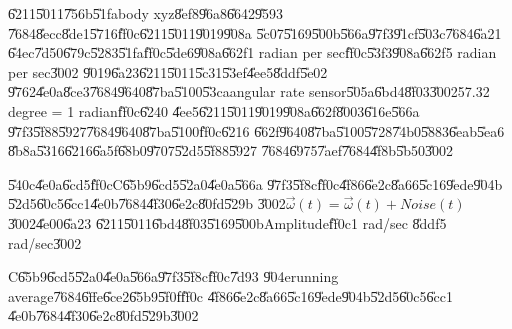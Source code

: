 \U{6211}\U{5011}\U{756b}\U{51fa}body xyz\U{8ef8}\U{96a8}\U{6642}\U{9593}%
\U{7684}\U{8ecc}\U{8de1}\U{5716}\U{ff0c}\U{6211}\U{5011}\U{9019}\U{908a}%
\U{5c07}\U{5169}\U{500b}\U{566a}\U{97f3}\U{91cf}\U{503c}\U{7684}\U{6a21}%
\U{64ec}\U{7d50}\U{679c}\U{5283}\U{51fa}\U{ff0c}\U{5de6}\U{908a}\U{662f}1
radian per sec\U{ff0c}\U{53f3}\U{908a}\U{662f}5 radian per sec\U{3002}%
\U{9019}\U{6a23}\U{6211}\U{5011}\U{5c31}\U{53ef}\U{4ee5}\U{8ddf}\U{5e02}%
\U{9762}\U{4e0a}\U{8ce3}\U{7684}\U{9640}\U{87ba}\U{5100}\U{53ca}angular rate
sensor\U{505a}\U{6bd4}\U{8f03}\U{3002}57.32 degree = 1 radian\U{ff0c}\U{6240}%
\U{4ee5}\U{6211}\U{5011}\U{9019}\U{908a}\U{662f}\U{8003}\U{616e}\U{566a}%
\U{97f3}\U{5f88}\U{5927}\U{7684}\U{9640}\U{87ba}\U{5100}\U{ff0c}\U{6216}%
\U{662f}\U{9640}\U{87ba}\U{5100}\U{5728}\U{74b0}\U{5883}\U{6eab}\U{5ea6}%
\U{8b8a}\U{5316}\U{6216}\U{6a5f}\U{68b0}\U{9707}\U{52d5}\U{5f88}\U{5927}%
\U{7684}\U{6975}\U{7aef}\U{7684}\U{4f8b}\U{5b50}\U{3002}

%
\begin{center}

\end{center}%

\bigskip

\begin{case}
\U{540c}\U{4e0a}\U{6cd5}\U{ff0c}C\U{65b9}\U{6cd5}\U{52a0}\U{4e0a}\U{566a}%
\U{97f3}\U{5f8c}\U{ff0c}\U{4f86}\U{6e2c}\U{8a66}\U{5c16}\U{9ede}\U{904b}%
\U{52d5}\U{60c5}\U{6cc1}\U{4e0b}\U{7684}\U{4f30}\U{6e2c}\U{80fd}\U{529b}%
\U{3002}$\vec{\omega}(t)=\vec{\omega}(t)+Noise(t)$\U{3002}\U{4e00}\U{6a23}%
\U{6211}\U{5011}\U{6bd4}\U{8f03}\U{5169}\U{500b}Amplitude\U{ff0c}1 rad/sec%
\U{8ddf}5 rad/sec\U{3002}
\end{case}

%
\begin{center}

\end{center}%

\begin{case}
C\U{65b9}\U{6cd5}\U{52a0}\U{4e0a}\U{566a}\U{97f3}\U{5f8c}\U{ff0c}\U{7d93}%
\U{904e}running average\U{7684}\U{6ffe}\U{6ce2}\U{65b9}\U{5f0f}\U{ff0c}%
\U{4f86}\U{6e2c}\U{8a66}\U{5c16}\U{9ede}\U{904b}\U{52d5}\U{60c5}\U{6cc1}%
\U{4e0b}\U{7684}\U{4f30}\U{6e2c}\U{80fd}\U{529b}\U{3002}
\end{case}

